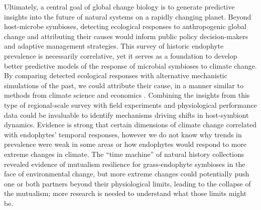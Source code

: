 \documentclass[11pt]{article}
\newcommand{\revise}[1]{{\color{black}{#1}}}
\begin{document}

\revise{\subsubsection*{Conclusion}}
Ultimately, a central goal of global change biology is to generate predictive insights into the future of natural systems on a rapidly changing planet. 
Beyond host-microbe symbioses, detecting ecological responses to anthropogenic global change and attributing their causes would inform public policy decision-makers and adaptive management strategies.
This survey of historic endophyte prevalence is necessarily correlative, yet it serves as a foundation to develop better predictive models of the response of microbial symbioses to climate change. 
By comparing detected ecological responses with alternative mechanistic simulations of the past, we could attribute their cause, in a manner similar to methods from climate science and economics \citep{stott2010detection, carleton2016social,trenberth2015attribution}.
Combining the insights from this type of regional-scale survey with field experiments and physiological performance data could be invaluable to identify mechanisms driving shifts in host-symbiont dynamics.
Evidence is strong that certain dimensions of climate change correlated with endophytes' temporal responses, however we do not know why trends in prevalence were weak in some areas or how endophytes would respond to more extreme changes in climate.
The ``time machine'' of natural history collections revealed evidence of mutualism resilience for grass-endophyte symbioses in the face of environmental change, but more extreme changes could potentially push one or both partners beyond their physiological limits, leading to the collapse of the mutualism; more research is needed to understand what those limits might be. 


	
\end{document}
